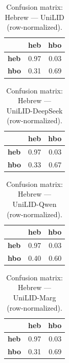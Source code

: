 \begin{table}[htbp]
\centering
\small
\begin{tabular}{lrr}
\toprule
 & \textbf{heb} & \textbf{hbo} \\
\midrule
\textbf{heb} & \cellcolor{blue!96}\color{white}0.97 & \cellcolor{blue!3}0.03 \\
\textbf{hbo} & \cellcolor{blue!30}0.31 & \cellcolor{blue!69}\color{white}0.69 \\
\bottomrule
\end{tabular}
\caption{Confusion matrix: Hebrew — UniLID (row-normalized).}
\label{tab:cm-hebrew-unilid}
\end{table}

\begin{table}[htbp]
\centering
\small
\begin{tabular}{lrr}
\toprule
 & \textbf{heb} & \textbf{hbo} \\
\midrule
\textbf{heb} & \cellcolor{blue!97}\color{white}0.97 & \cellcolor{blue!2}0.03 \\
\textbf{hbo} & \cellcolor{blue!33}0.33 & \cellcolor{blue!66}\color{white}0.67 \\
\bottomrule
\end{tabular}
\caption{Confusion matrix: Hebrew — UniLID-DeepSeek (row-normalized).}
\label{tab:cm-hebrew-unilid-deepseek}
\end{table}

\begin{table}[htbp]
\centering
\small
\begin{tabular}{lrr}
\toprule
 & \textbf{heb} & \textbf{hbo} \\
\midrule
\textbf{heb} & \cellcolor{blue!96}\color{white}0.97 & \cellcolor{blue!3}0.03 \\
\textbf{hbo} & \cellcolor{blue!39}0.40 & \cellcolor{blue!60}\color{white}0.60 \\
\bottomrule
\end{tabular}
\caption{Confusion matrix: Hebrew — UniLID-Qwen (row-normalized).}
\label{tab:cm-hebrew-unilid-qwen}
\end{table}

\begin{table}[htbp]
\centering
\small
\begin{tabular}{lrr}
\toprule
 & \textbf{heb} & \textbf{hbo} \\
\midrule
\textbf{heb} & \cellcolor{blue!96}\color{white}0.97 & \cellcolor{blue!3}0.03 \\
\textbf{hbo} & \cellcolor{blue!31}0.31 & \cellcolor{blue!68}\color{white}0.69 \\
\bottomrule
\end{tabular}
\caption{Confusion matrix: Hebrew — UniLID-Marg (row-normalized).}
\label{tab:cm-hebrew-unilid-marg}
\end{table}

